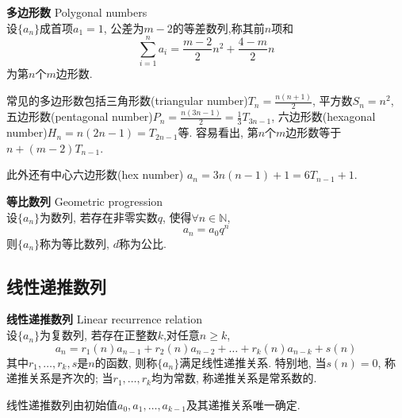 \begin{dfn}\textbf{多边形数} Polygonal numbers\\
设$\{a_n\}$成首项$a_1=1$, 公差为$m-2$的等差数列,称其前$n$项和
\begin{equation}
    \sum_{i=1}^n a_i = \frac{m-2}{2}n^2 + \frac{4-m}{2}n
\end{equation}
为第$n$个$m$边形数. 
\end{dfn}
\par 常见的多边形数包括三角形数(triangular number)$T_n=\frac{n(n+1)}{2}$, 平方数$S_n=n^2$, 五边形数(pentagonal number)$P_n = \frac{n(3n-1)}{2}=\frac{1}{3}T_{3n-1}$, 六边形数(hexagonal number)$H_n = n(2n-1)=T_{2n-1}$等. 容易看出, 第$n$个$m$边形数等于$n+(m-2)T_{n-1}$. 
\par 此外还有中心六边形数(hex number) $a_n=3n(n-1)+1=6T_{n-1}+1$.

\begin{dfn}\textbf{等比数列} Geometric progression\\
设$\{a_n\}$为数列, 若存在非零实数$q$, 使得$\forall n\in \mathbb{N}$, 
\begin{equation}
    a_n=a_0q^n
\end{equation}
则$\{a_n\}$称为等比数列, $d$称为公比. 
\end{dfn}

\subsection{线性递推数列}

\begin{dfn}\textbf{线性递推数列} Linear recurrence relation\\
设$\{a_n\}$为复数列, 若存在正整数$k$,对任意$n\ge k$, 
\begin{equation}
    a_n = r_1(n) a_{n-1} + r_2(n) a_{n-2} +\dots+r_k(n) a_{n-k} +s(n)
\end{equation}
其中$r_1,\dots,r_k,s$是$n$的函数, 则称$\{a_n\}$满足线性递推关系. 特别地, 当$s(n)=0$, 称递推关系是齐次的; 当$r_1,\dots,r_k$均为常数, 称递推关系是常系数的.
\end{dfn}
线性递推数列由初始值$a_0, a_1,\dots, a_{k-1}$及其递推关系唯一确定. 

